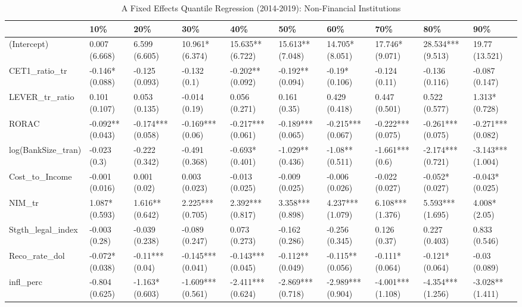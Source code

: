 \begin{table}[ht]
\centering
\caption{A Fixed Effects Quantile Regression (2014-2019): Non-Financial Institutions} 
\begingroup\small
\begin{tabular}{llllllllll}
  \toprule
 & 10\% & 20\% & 30\% & 40\% & 50\% & 60\% & 70\% & 80\% & 90\% \\ 
  \midrule
(Intercept) & 0.007 (6.668) & 6.599 (6.605) & 10.961* (6.374) & 15.635** (6.722) & 15.613** (7.048) & 14.705* (8.051) & 17.746* (9.071) & 28.534*** (9.513) & 19.77 (13.521) \\ 
  CET1\_ratio\_tr & -0.146* (0.088) & -0.125 (0.093) & -0.132 (0.1) & -0.202** (0.092) & -0.192** (0.094) & -0.19* (0.106) & -0.124 (0.11) & -0.136 (0.116) & -0.087 (0.147) \\ 
  LEVER\_tr\_ratio & 0.101 (0.107) & 0.053 (0.135) & -0.014 (0.19) & 0.056 (0.271) & 0.161 (0.35) & 0.429 (0.418) & 0.447 (0.501) & 0.522 (0.577) & 1.313* (0.728) \\ 
  RORAC & -0.092** (0.043) & -0.174*** (0.058) & -0.169*** (0.06) & -0.217*** (0.061) & -0.189*** (0.065) & -0.215*** (0.067) & -0.222*** (0.075) & -0.261*** (0.075) & -0.271*** (0.082) \\ 
  log(BankSize\_tran) & -0.023 (0.3) & -0.222 (0.342) & -0.491 (0.368) & -0.693* (0.401) & -1.029** (0.436) & -1.08** (0.511) & -1.661*** (0.6) & -2.174*** (0.721) & -3.143*** (1.004) \\ 
  Cost\_to\_Income & -0.001 (0.016) & 0.001 (0.02) & 0.003 (0.023) & -0.013 (0.025) & -0.009 (0.025) & -0.006 (0.026) & -0.022 (0.027) & -0.052* (0.027) & -0.043* (0.025) \\ 
  NIM\_tr & 1.087* (0.593) & 1.616** (0.642) & 2.225*** (0.705) & 2.392*** (0.817) & 3.358*** (0.898) & 4.237*** (1.079) & 6.108*** (1.376) & 5.593*** (1.695) & 4.008* (2.05) \\ 
  Stgth\_legal\_index & -0.003 (0.28) & -0.039 (0.238) & -0.089 (0.247) & 0.073 (0.273) & -0.162 (0.286) & -0.256 (0.345) & 0.126 (0.37) & 0.227 (0.403) & 0.833 (0.546) \\ 
  Reco\_rate\_dol & -0.072* (0.038) & -0.11*** (0.04) & -0.145*** (0.041) & -0.143*** (0.045) & -0.112** (0.049) & -0.115** (0.056) & -0.111* (0.064) & -0.121* (0.064) & -0.03 (0.089) \\ 
  infl\_perc & -0.804 (0.625) & -1.163* (0.603) & -1.609*** (0.561) & -2.411*** (0.624) & -2.869*** (0.718) & -2.989*** (0.904) & -4.001*** (1.108) & -4.354*** (1.256) & -3.028** (1.411) \\ 

\end{tabular}
\end{table}
